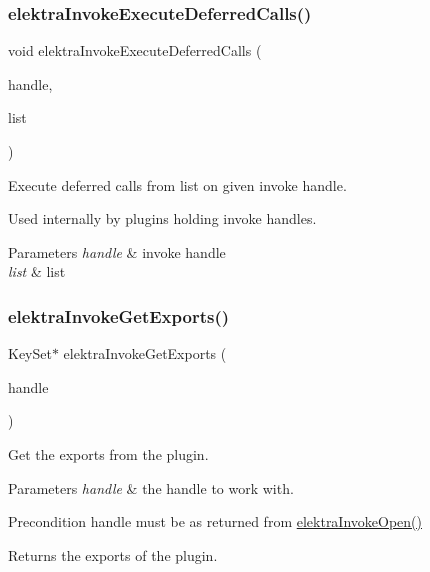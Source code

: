 \subsubsection{\texorpdfstring{elektra\+Invoke\+Execute\+Deferred\+Calls()}{elektraInvokeExecuteDeferredCalls()}}
{\footnotesize\ttfamily void elektra\+Invoke\+Execute\+Deferred\+Calls (\begin{DoxyParamCaption}\item[{Elektra\+Invoke\+Handle $\ast$}]{handle,  }\item[{Elektra\+Deferred\+Call\+List $\ast$}]{list }\end{DoxyParamCaption})}



Execute deferred calls from list on given invoke handle. 

Used internally by plugins holding invoke handles.


\begin{DoxyParams}{Parameters}
{\em handle} & invoke handle \\
\hline
{\em list} & list \\
\hline
\end{DoxyParams}
\mbox{\label{group__invoke_ga6ab386aba337d8d3fd7978070d613efe}} 
\subsubsection{\texorpdfstring{elektra\+Invoke\+Get\+Exports()}{elektraInvokeGetExports()}}
{\footnotesize\ttfamily Key\+Set$\ast$ elektra\+Invoke\+Get\+Exports (\begin{DoxyParamCaption}\item[{Elektra\+Invoke\+Handle $\ast$}]{handle }\end{DoxyParamCaption})}



Get the exports from the plugin. 


\begin{DoxyParams}{Parameters}
{\em handle} & the handle to work with.\\
\hline
\end{DoxyParams}
\begin{DoxyPrecond}{Precondition}
handle must be as returned from \hyperlink{group__invoke_ga3eb20131e9a8fc9a6cebf126927c09bc}{elektra\+Invoke\+Open()}
\end{DoxyPrecond}
\begin{DoxyReturn}{Returns}
the exports of the plugin. 
\end{DoxyReturn}
\mbox{\label{group__invoke_ga4531a643a71a63c19c94d87bd8d0b40f}} 
